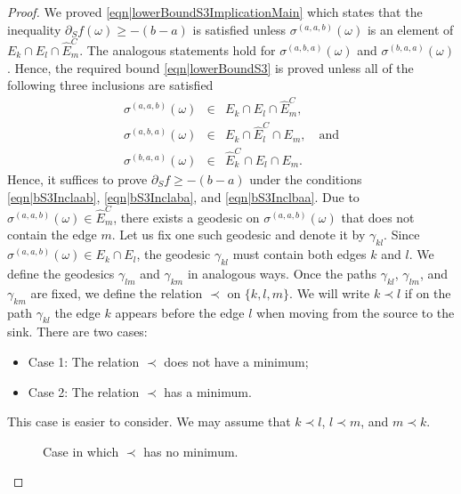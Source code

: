 \documentclass[reqno]{amsart}
\begin{document}
\begin{proof}
We proved \eqref{eqn|lowerBoundS3ImplicationMain} which states that the inequality $\partial_S f(\omega)\geq -(b-a)$ is satisfied unless 
$\sigma^{(a,a,b)}(\omega)$ is an element of $E_k\cap E_l\cap \hat E_m^C$. The analogous statements hold for $\sigma^{(a,b,a)}(\omega)$ and $\sigma^{(b,a,a)}(\omega)$. Hence, the required bound \eqref{eqn|lowerBoundS3} is proved unless all of the following three inclusions are satisfied
\begin{eqnarray}
\sigma^{(a,a,b)}(\omega)&\in& E_k\cap E_l\cap \hat E_m^C, \label{eqn|bS3Inclaab}\\
\sigma^{(a,b,a)}(\omega)&\in& E_k\cap \hat E_l^C\cap E_m,\quad\mbox{and} \label{eqn|bS3Inclaba}\\
\sigma^{(b,a,a)}(\omega)&\in& \hat E_k^C\cap E_l\cap E_m. \label{eqn|bS3Inclbaa}
\end{eqnarray}
Hence, it suffices to prove $\partial_Sf\geq -(b-a)$ under the conditions \eqref{eqn|bS3Inclaab}, \eqref{eqn|bS3Inclaba}, and \eqref{eqn|bS3Inclbaa}.
Due to $\sigma^{(a,a,b)}(\omega)\in \hat E_m^C$, there exists a geodesic on $\sigma^{(a,a,b)}(\omega)$ that does not contain the edge $m$. Let us fix one such geodesic and denote it by $\gamma_{kl}$. Since $\sigma^{(a,a,b)}(\omega)\in E_k\cap E_l$, the geodesic $\gamma_{kl}$ must contain both edges $k$ and $l$. We define the geodesics $\gamma_{lm}$ and $\gamma_{km}$ in analogous ways. Once the paths $\gamma_{kl}$, $\gamma_{lm}$, and $\gamma_{km}$ are fixed, we define the relation $\prec$ on $\{k,l,m\}$. We will write $k\prec l$ if on the path $\gamma_{kl}$ the edge $k$ appears before the edge $l$ when moving from the source to the sink. There are two cases: 
\begin{itemize}
\item Case 1: The relation $\prec$ does not have a minimum;
\item Case 2: The relation $\prec$ has a minimum.
\end{itemize}

 This case is easier to consider. We may assume that $k\prec l$, $l\prec m$, and $m\prec k$. 

 \begin{figure}[t]
 \centering
{}
\caption{Case in which $\prec$ has no minimum.}
\label{fig|LowerBound3NoMin}
\end{figure}


\end{proof}
\end{document}
